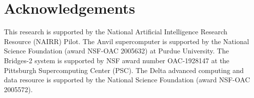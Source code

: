 \documentclass{article}
\begin{document}
\section{Acknowledgements}
This research is supported by the National Artificial Intelligence Research
Resource (NAIRR) Pilot.
The Anvil supercomputer is supported by the National Science Foundation (award NSF-OAC 2005632) at Purdue University.
The Bridges-2 system is supported by NSF award number OAC-1928147 at the Pittsburgh Supercomputing Center (PSC).
The Delta advanced computing and data resource is supported by the National Science Foundation (award NSF-OAC 2005572).


\printbibliography
\end{document}
